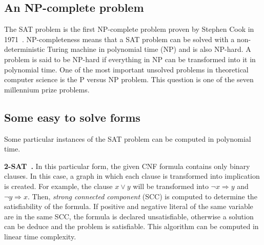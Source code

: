 \subsection{An NP-complete problem}
The SAT problem is the first NP-complete problem proven by Stephen Cook in 1971~\cite{cook1971complexity}.
NP-completeness means that a SAT problem can be solved with a non-deterministic Turing machine in polynomial time (NP) and is also NP-hard. A problem is said to be NP-hard if everything in NP can be transformed into it in polynomial time. 
One of the most important unsolved problems in theoretical computer science is the P versus NP problem.
This question is one of the seven millennium prize problems.

\subsection{Some easy to solve forms}

Some particular instances of the SAT problem can be computed in polynomial time.

\textbf{2-SAT~\cite{aspvall1979linear}.}
In this particular form, the given CNF formula contains only binary clauses.
In this case, a graph in which each clause is transformed into implication is created.
For example, the clause $x \lor y$ will be transformed into $ \neg x \Rightarrow y$ and $\neg y \Rightarrow x$.
Then, \emph{strong connected component} (SCC) is computed to determine the satisfiability of the formula.
If  positive and negative literal of the same variable are in the same SCC, the formula is declared unsatisfiable, otherwise 
a solution can be deduce and the problem is satisfiable. This algorithm can be computed in linear time complexity.



